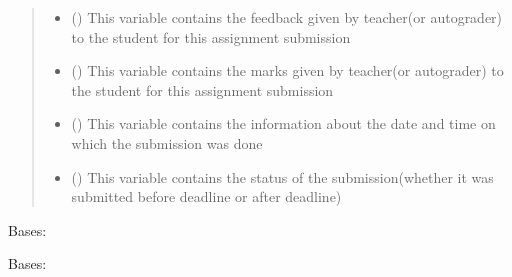 \documentclass[letterpaper,10pt,english]{sphinxmanual}
\begin{document}
\begin{fulllineitems}
\begin{quote}
\begin{description}
\begin{itemize}
\item {} 
\sphinxAtStartPar
{} () \textendash{} This variable contains the feedback given by teacher(or autograder) to the student for this assignment submission

\item {} 
\sphinxAtStartPar
{} () \textendash{} This variable contains the marks given by teacher(or autograder) to the student for this assignment submission

\item {} 
\sphinxAtStartPar
{} () \textendash{} This variable contains the information about the date and time on which the submission was done

\item {} 
\sphinxAtStartPar
{} () \textendash{} This variable contains the status of the submission(whether it was submitted before deadline or after deadline)

\end{itemize}

\end{description}\end{quote}

\begin{fulllineitems}
\label{\detokenize{users:users.models.studentsubmissions.DoesNotExist}}
\sphinxAtStartPar
Bases: 

\end{fulllineitems}


\begin{fulllineitems}
\label{\detokenize{users:users.models.studentsubmissions.MultipleObjectsReturned}}
\sphinxAtStartPar
Bases: 


\end{fulllineitems}
\end{fulllineitems}
\end{document}
